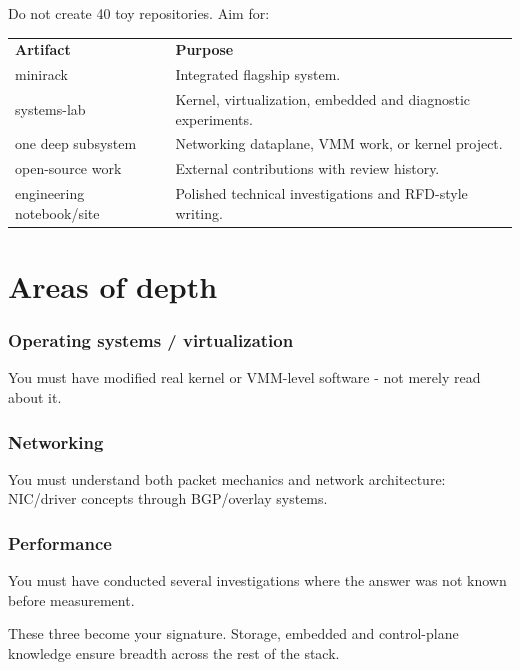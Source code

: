 \documentclass[11pt,letterpaper]{article}
\begin{document}
Do not create 40 toy repositories. Aim for:

\begin{center}
\small
\begin{tabular}{>{\raggedright\arraybackslash}p{}>{\raggedright\arraybackslash}p{}}
\textbf{Artifact} & \textbf{Purpose} \\
minirack & Integrated flagship system. \\
systems-lab & Kernel, virtualization, embedded and diagnostic experiments. \\
one deep subsystem & Networking dataplane, VMM work, or kernel project. \\
open-source work & External contributions with review history. \\
engineering notebook/site & Polished technical investigations and RFD-style writing. \\
\end{tabular}
\end{center}

\section{Areas of depth}\label{sec:18}

\subsubsection*{Operating systems / virtualization}

You must have modified real kernel or VMM-level software - not merely read about it.

\subsubsection*{Networking}

You must understand both packet mechanics and network architecture: NIC/\allowbreak driver concepts through BGP/\allowbreak overlay systems.

\subsubsection*{Performance}

You must have conducted several investigations where the answer was not known before measurement.

These three become your signature. Storage, embedded and control-plane knowledge ensure breadth across the rest of the stack.
\end{document}
